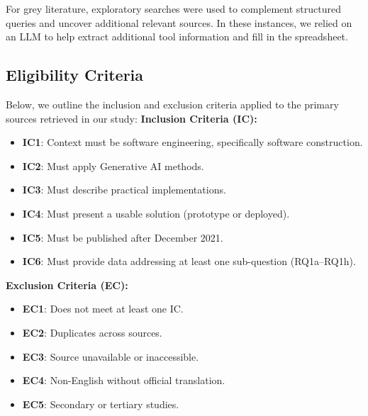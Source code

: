 For grey literature, exploratory searches were used to complement structured queries and uncover additional relevant sources. In these instances, we relied on an LLM to help extract additional tool information and fill in the spreadsheet.


\subsection{Eligibility Criteria}
Below, we outline the inclusion and exclusion criteria applied to the primary sources retrieved in our study:
\textbf{Inclusion Criteria (IC):}
\begin{itemize}
\item \textbf{IC1}: Context must be software engineering, specifically software construction.
\item \textbf{IC2}: Must apply Generative AI methods.
\item \textbf{IC3}: Must describe practical implementations.
\item \textbf{IC4}: Must present a usable solution (prototype or deployed).
\item \textbf{IC5}: Must be published after December 2021.
\item \textbf{IC6}: Must provide data addressing at least one sub-question (RQ1a–RQ1h).
\end{itemize}

\textbf{Exclusion Criteria (EC):}
\begin{itemize}
\item \textbf{EC1}: Does not meet at least one IC.
\item \textbf{EC2}: Duplicates across sources.
\item \textbf{EC3}: Source unavailable or inaccessible.
\item \textbf{EC4}: Non-English without official translation.
\item \textbf{EC5}: Secondary or tertiary studies.
\end{itemize}




